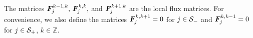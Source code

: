 The matrices \(\boldsymbol F_j^{k-1,k},\,\boldsymbol F_j^{k,k},\) and \(\boldsymbol F_j^{k+1,k}\) are the local flux matrices. For convenience, we also define the matrices \(\boldsymbol F_j^{k,k+1}=0\) for \(j\in\mathcal{S}_-\) and \(\boldsymbol F_j^{k,k-1}=0\) for \(j\in\mathcal{S}_+\), \(k\in\mathbb Z\).


%
%

